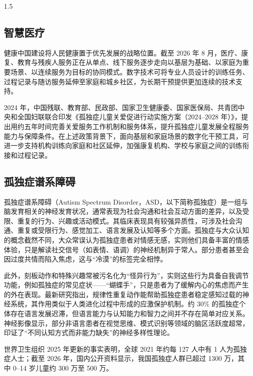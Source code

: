 \documentclass[zihao=-4]{ctexart}
\begin{document}
\begin{spacing}{1.5}

\subsection{智慧医疗}

健康中国建设将人民健康置于优先发展的战略位置\cite{ref1,ref2,ref3}。截至 2026 年 8 月，医疗、康复、教育与残疾人服务正在从单点、线下服务逐步走向以基层为基础、以家庭为重要场景、以连续服务为目标的协同模式。数字技术可将专业人员设计的训练任务、过程记录与随访服务延伸至家庭和城乡社区，为长期干预提供更加连续的技术支持。

2024 年，中国残联、教育部、民政部、国家卫生健康委、国家医保局、共青团中央和全国妇联联合印发《孤独症儿童关爱促进行动实施方案（2024--2028 年）》，提出用约五年时间完善关爱服务工作机制和服务体系，提升孤独症儿童发展全程服务能力与保障条件\cite{ref4}。在上述政策背景下，面向基层和家庭场景的数字化干预工具，可进一步支持机构训练向家庭和社区延伸，加强康复机构、学校与家庭之间的训练衔接和过程记录。

\subsection{孤独症谱系障碍}

孤独症谱系障碍（Autism Spectrum Disorder，ASD，以下简称孤独症）是一组与脑发育相关的神经发育状况，通常表现为社会沟通和社会互动方面的差异，以及受限、重复的行为、兴趣或活动模式。其临床表现具有较强异质性，可涉及社会沟通、重复或受限行为、感觉加工、语言发展及认知等多个方面。孤独症与大众认知的概念截然不同，大众常误认为孤独症患者对情感无感，实则他们具备丰富的情感体验，只是解读社交信号（如表情、语调）的神经机制异于常人。部分患者甚至会因过度共情而陷入焦虑，这与“冷漠”的标签完全相悖。

此外，刻板动作和特殊兴趣常被污名化为“怪异行为”，实则这些行为具备自我调节功能，例如孤独症的常见症状——“蝴蝶手”，只是患者为了缓解内心的焦虑而产生的外在表现。最新研究指出，规律性重复动作能帮助孤独症患者稳定感知过载的神经系统，其作用类似于人类进化过程中形成的应激保护机制。约 30\% 的孤独症个体存在语言发展迟滞，但语言能力与认知能力和智力之间并不存在简单对应关系。神经影像显示，部分非语言患者在视觉思维、模式识别等领域的脑区活跃度超常，印证了“不同认知方式而非能力缺失”的神经多样性理论。

世界卫生组织 2025 年更新的事实表明，全球 2021 年约每 127 人中有 1 人为孤独症人士；截至 2026 年，国内公开资料显示，我国孤独症人群已超过 1300 万，其中 0--14 岁儿童约 300 万至 500 万\cite{ref5}。


\end{spacing}
\end{document}
